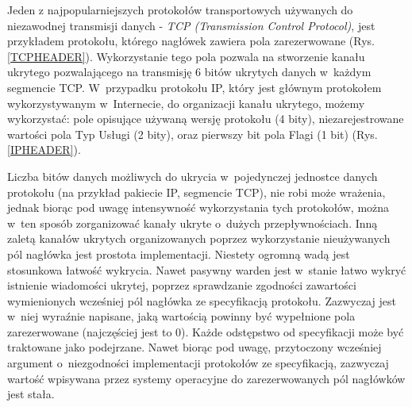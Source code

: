 \documentclass[a4paper, twoside, openright, 12pt]{report}
\begin{document}
        Jeden z najpopularniejszych protokołów transportowych używanych do niezawodnej
        transmisji danych - \emph{TCP (Transmission Control Protocol)}, jest przykładem protokołu,
        którego nagłówek zawiera pola zarezerwowane (Rys. \ref{TCPHEADER}).
        Wykorzystanie tego pola pozwala na stworzenie kanału ukrytego pozwalającego
        na transmisję 6 bitów ukrytych danych w~każdym segmencie TCP. W~przypadku protokołu
        IP, który jest głównym protokołem wykorzystywanym w~Internecie, do organizacji
        kanału ukrytego, możemy wykorzystać: pole
        opisujące używaną wersję protokołu (4 bity), niezarejestrowane wartości pola Typ Usługi (2 bity),
        oraz pierwszy bit pola Flagi (1 bit) (Rys. \ref{IPHEADER})\cite{IPRFC}.

        Liczba bitów danych
        możliwych do ukrycia w~pojedynczej jednostce danych protokołu (na przykład pakiecie IP, segmencie TCP),
        nie robi może wrażenia, jednak biorąc
        pod uwagę intensywność wykorzystania tych protokołów, można w~ten sposób
        zorganizować kanały ukryte o~dużych przepływnościach. Inną zaletą kanałów ukrytych organizowanych
        poprzez wykorzystanie nieużywanych pól nagłówka jest prostota implementacji.
        Niestety ogromną wadą jest stosunkowa
        łatwość wykrycia. Nawet pasywny warden jest w~stanie łatwo wykryć istnienie wiadomości
        ukrytej, poprzez sprawdzanie zgodności zawartości wymienionych wcześniej pól
        nagłówka ze specyfikacją protokołu. Zazwyczaj jest w~niej wyraźnie napisane,
        jaką wartością powinny być wypełnione pola zarezerwowane (najczęściej jest to 0).
        Każde odstępstwo od specyfikacji może być traktowane jako podejrzane. Nawet biorąc
        pod uwagę, przytoczony wcześniej argument o~niezgodności implementacji protokołów
        ze specyfikacją, zazwyczaj wartość wpisywana przez systemy operacyjne do
        zarezerwowanych pól nagłówków jest stała.
\end{document}
